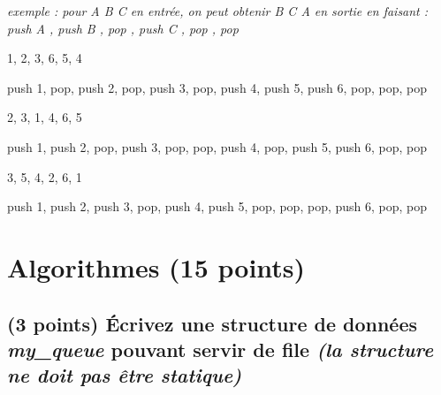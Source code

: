 \documentclass[11pt,a4paper]{article}
\begin{document}
\bigskip

\begin{center}
\noindent \textit{exemple : pour \og A B C \fg{} en entrée, on peut obtenir \og B C A \fg{} en sortie en faisant : \linebreak
\og push A \fg, \og push B \fg, \og pop \fg, \og push C \fg, \og pop \fg, \og pop \fg }
\end{center}

\medskip


\begin{center}

\begin{large}
1, 2, 3, 6, 5, 4
\end{large}

\begin{center}
 push 1, pop, push 2, pop, push 3, pop, push 4, push 5, push 6, pop, pop, pop
\end{center}


\begin{large}
2, 3, 1, 4, 6, 5
\end{large}

\begin{center}
 push 1, push 2, pop, push 3, pop, pop, push 4, pop, push 5, push 6, pop, pop
\end{center}


\begin{large}
3, 5, 4, 2, 6, 1
\end{large}

\begin{center}
 push 1, push 2, push 3, pop, push 4, push 5, pop, pop, pop, push 6, pop, pop
\end{center}

\end{center}


%
\section{Algorithmes (15 points)}

\subsection{(3 points) \'Ecrivez une structure de données \og \textit{my\_queue} \fg{} pouvant servir de file \textit{(la structure ne doit pas être statique)} }
\end{document}
